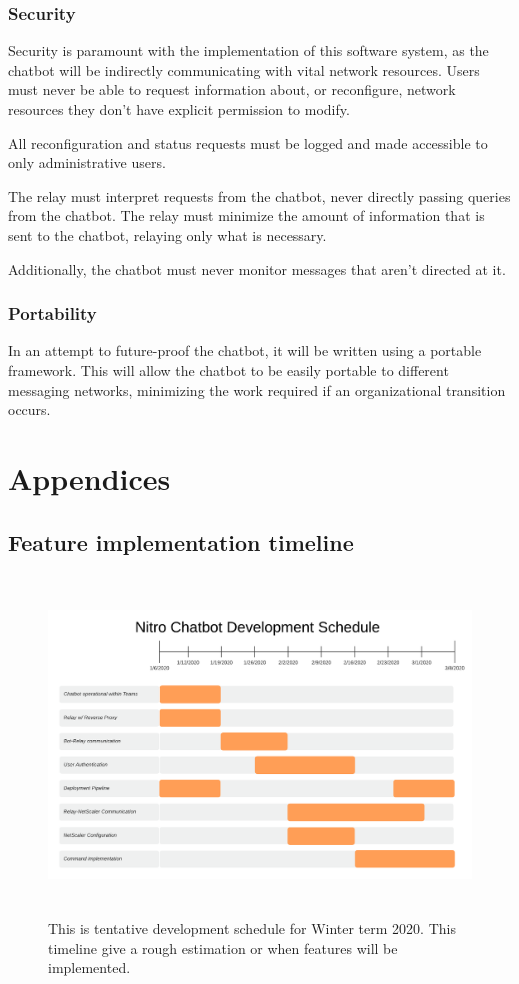 \documentclass[onecolumn, draftclsnofoot,10pt, compsoc]{IEEEtran}
\begin{document}
\subsubsection{Security}
Security is paramount with the implementation of this software system, as the chatbot will be indirectly communicating with vital network resources.
Users must never be able to request information about, or reconfigure, network resources they don't have explicit permission to modify.

All reconfiguration and status requests must be logged and made accessible to only administrative users.

The relay must interpret requests from the chatbot, never directly passing queries from the chatbot.
The relay must minimize the amount of information that is sent to the chatbot, relaying only what is necessary.

Additionally, the chatbot must never monitor messages that aren't directed at it.

\subsubsection{Portability}
In an attempt to future-proof the chatbot, it will be written using a portable framework.
This will allow the chatbot to be easily portable to different messaging networks, minimizing the work required if an organizational transition occurs.

\clearpage
\section{Appendices}
\subsection{Feature implementation timeline}
\begin{figure}[h]
    \centering
    \includegraphics[height=9cm]{gantt.png}
    \caption[Feature implementation timeline]{This is tentative development schedule for Winter term 2020. This timeline give a rough estimation or when features will be implemented.}
    \label{fig:Feature implementation Timeline}
\end{figure}

\clearpage


\end{document}
